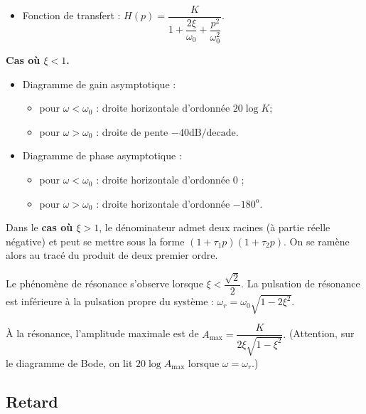 \begin{resultat}
\begin{itemize}
\item Fonction de transfert : $H(p)=\dfrac{K}{1+\dfrac{2\xi}{\omega_0}+\dfrac{p^2}{\omega_0^2}}$.
\end{itemize}
\begin{center}
\textbf{Cas où $\xi<1$.}
\end{center}
\begin{itemize}
\item Diagramme de gain asymptotique : 
\begin{itemize}
\item pour $\omega<\omega_0$ : droite horizontale d'ordonnée $20 \log K$;
\item pour $\omega>\omega_0$ : droite de pente $-{40}\text{dB/decade}$.
\end{itemize}
\item Diagramme de phase asymptotique : 
\begin{itemize}
\item pour $\omega<\omega_0$ : droite horizontale d'ordonnée 0 \degre;
\item pour $\omega>\omega_0$ : droite horizontale d'ordonnée $-180^{\text{o}}$.
\end{itemize}
\end{itemize}


Dans le \textbf{cas où $\xi>1$}, le dénominateur admet deux racines (à partie réelle négative) et peut se mettre sous la forme  $\left(1+\tau_1 p \right)\left(1+\tau_2 p \right)$. On se ramène alors au tracé du produit de deux premier ordre.
\end{resultat}


\begin{resultat}

Le phénomène de résonance s'observe lorsque $\xi<\dfrac{\sqrt{2}}{2}$. La pulsation de résonance est inférieure à la pulsation propre du système :
$\omega_r = \omega_0\sqrt{1-2\xi^2}$.

\`A la résonance, l'amplitude maximale est de 
$A_{\text{max}} = \dfrac{K}{2\xi\sqrt{1-\xi^2}}.$
(Attention, sur le diagramme de Bode, on lit $20\log A_{\text{max}}$ lorsque $\omega=\omega_r$.)
\end{resultat}

\newpage

\subsection{Retard}

